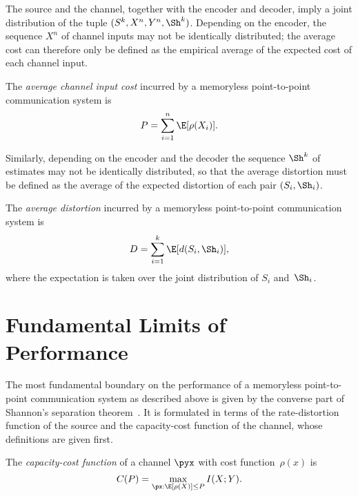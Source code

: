 The source and the channel, together with the encoder and decoder, imply a joint
distribution of the tuple $(S^k, X^n, Y^n, \Sh^k)$.  Depending on the encoder,
the sequence $X^n$ of channel inputs may not be identically distributed; the
average cost can therefore only be defined as the empirical average of the
expected cost of each channel input.

\begin{definition}
  \label{def:avgcost}
  The \emph{average channel input cost} incurred by a memoryless point-to-point
  communication system is
  \begin{equation*}
    P = \sum_{i=1}^n \E[\rho(X_i)].
  \end{equation*}
\end{definition}

Similarly, depending on the encoder and the decoder the sequence $\Sh^k$ of
estimates may not be identically distributed, so that the average distortion
must be defined as the average of the expected distortion of each pair $(S_i,
\Sh_i)$. 

\begin{definition}
  \label{def:avgdist}
  The \emph{average distortion} incurred by a memoryless point-to-point
  communication system is
  \begin{equation*}
    D = \sum_{i=1}^k \E[d(S_i, \Sh_i)],
  \end{equation*}
  where the expectation is taken over the joint distribution of $S_i$
  and~$\Sh_i$.
\end{definition}


\section{Fundamental Limits of Performance}

The most fundamental boundary on the performance of a memoryless point-to-point
communication system as described above is given by the converse part of
Shannon's separation theorem~\cite{Gallager1968}. It is formulated in terms of
the rate-distortion function of the source and the capacity-cost function of the
channel, whose definitions are given first. 

\begin{definition}
  \label{def:capacity}
  The \emph{capacity-cost function} of a channel $\pyx$ with cost
  function~$\rho(x)$ is
  \begin{equation*}
    C(P) = \max_{\px: \E[\rho(X)] \le P} I(X;Y).
  \end{equation*}
\end{definition}

